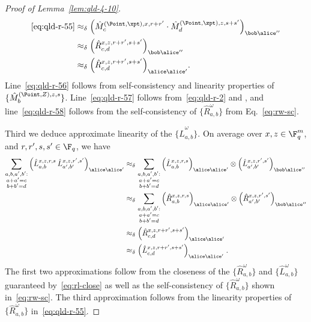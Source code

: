 \begin{proof}[Proof of Lemma~\ref{lem:qld-4-10}]
 \begin{align}
\text{\eqref{eq:qld-r-55}} &\approx_\delta \Big(\hat{M}^{(\Point,\xpt),x,r+r'}_{c} \cdot \hat{M}^{(\Point,\zpt),z,s+s'}_{d}  \Big)_{\bob \alice''} \label{eq:qld-r-56} \\
 &\approx_\delta \Big ( \hat{R}^{x,z,r+r',s+s'}_{c,d} \Big)_{\bob \alice''} \label{eq:qld-r-57} \\
 &\approx_\delta \Big ( \hat{R}^{x,z,r+r',s+s'}_{c,d} \Big)_{\alice \alice'} \label{eq:qld-r-58}.
	\end{align}	
Line~\eqref{eq:qld-r-56} follows from self-consistency and linearity properties of $\{ \hat{M}^{(\Point,Z),z,s}_b \}$. Line~\eqref{eq:qld-r-57} follows from~\eqref{eq:qld-r-2} and , and line~\eqref{eq:qld-r-58} follows from the self-consistency of $\{ \hat{R}^\omega_{a,b} \}$ from Eq.~\eqref{eq:rw-sc}. 
	
Third we deduce approximate linearity of the $\{ \hat{L}^\omega_{a,b} \}$. On average over $x,z \in \F_q^m$, and $r,r',s,s' \in \F_q$, we have
	\begin{align}
	\sum_{\substack{a,b,a',b': \\ a + a' = c \\ b + b' = d}}  \Big ( \hat{L}^{x,z,r,s}_{a,b} \, \hat{L}^{x,z,r',s'}_{a',b'} \Big)_{\alice \alice'} &\approx_\delta  \sum_{\substack{a,b,a',b': \\ a + a' = c \\ b + b' = d}} \Big( \hat{L}^{x,z,r,s}_{a,b} \Big)_{\alice \alice'} \otimes \Big (\hat{L}^{x,z,r',s'}_{a',b'} \Big)_{\bob \alice''}\notag \\
		&\approx_\delta  \sum_{\substack{a,b,a',b' : \\ a + a' = c \\ b + b' = d}}  \Big( \hat{R}^{x,z,r,s}_{a,b} \Big)_{\alice \alice'} \otimes \Big( \hat{R}^{x,z,r',s'}_{a',b'} \Big)_{\bob \alice''} \notag\\
		&\approx_\delta \Big ( \hat{R}^{x,z,r+r',s+s'}_{c,d} \Big)_{\alice \alice'} \notag\\
		&\approx_\delta \Big ( \hat{L}^{x,z,r+r',s+s'}_{c,d} \Big)_{\alice \alice'}\;.\label{eq:l-al}
	\end{align}
	The first two approximations follow from the closeness of the $\{ \hat{R}^\omega_{a,b} \}$ and $\{ \hat{L}^\omega_{a,b} \}$  guaranteed by~\eqref{eq:rl-close} as well as the self-consistency of $\{ \hat{R}^\omega_{a,b} \}$ shown in~\eqref{eq:rw-sc}. The third approximation follows from the linearity properties of $\{ \hat{R}^\omega_{a,b} \}$ in~\eqref{eq:qld-r-55}. 
	

\end{proof}
